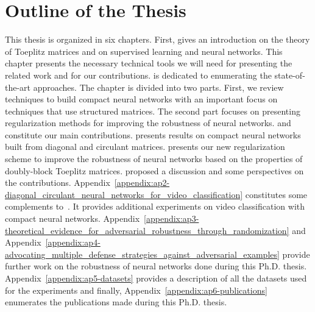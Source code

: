 \section*{Outline of the Thesis}
\label{section:ch1-outline_of_the_thesis}

This thesis is organized in six chapters.
First,  gives an introduction on the theory of Toeplitz matrices and on supervised learning and neural networks.
This chapter presents the necessary technical tools we will need for presenting the related work and for our contributions.
 is dedicated to enumerating the state-of-the-art approaches.
The chapter is divided into two parts.
First, we review techniques to build compact neural networks with an important focus on techniques that use structured matrices.
The second part focuses on presenting regularization methods for improving the robustness of neural networks.
 and  constitute our main contributions.
 presents results on compact neural networks built from diagonal and circulant matrices. 
 presents our new regularization scheme to improve the robustness of neural networks based on the properties of doubly-block Toeplitz matrices.
 proposed a discussion and some perspectives on the contributions.
Appendix~\ref{appendix:ap2-diagonal_circulant_neural_networks_for_video_classification} constitutes some complements to~.
It provides additional experiments on video classification with compact neural networks.
Appendix~\ref{appendix:ap3-theoretical_evidence_for_adversarial_robustness_through_randomization} and Appendix~\ref{appendix:ap4-advocating_multiple_defense_strategies_against_adversarial_examples} provide further work on the robustness of neural networks done during this Ph.D. thesis.
Appendix~\ref{appendix:ap5-datasets} provides a description of all the datasets used for the experiments and finally, Appendix~\ref{appendix:ap6-publications} enumerates the publications made during this Ph.D. thesis.




